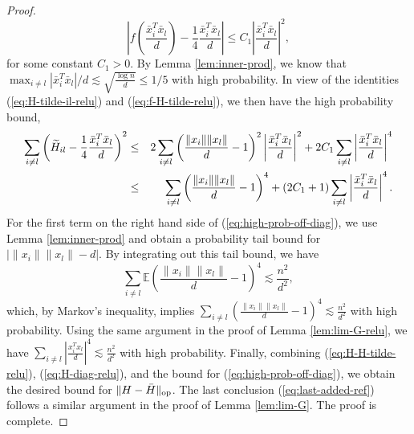 \begin{proof}
$$\left|f\left(\frac{\bar{x}_i^T\bar{x}_l}{d}\right)-\frac{1}{4}\frac{\bar{x}_i^T\bar{x}_l}{d}\right|\leq C_1\left|\frac{\bar{x}_i^T\bar{x}_l}{d}\right|^2,$$
for some constant $C_1>0$. By Lemma \ref{lem:inner-prod}, we know that $\max_{i\neq l}|\bar{x}_i^T\bar{x}_l|/d\lesssim \sqrt{\frac{\log n}{d}}\leq 1/5$ with high probability. In view of the identities (\ref{eq:H-tilde-il-relu}) and (\ref{eq:f-H-tilde-relu}), we then have the high probability bound,
\begin{eqnarray}
\nonumber \sum_{i\neq l}\left(\wt{H}_{il}-\frac{1}{4}\frac{\bar{x}_i^T\bar{x}_l}{d}\right)^2 &\leq& 2\sum_{i\neq l}\left(\frac{\|x_i\|\|x_l\|}{d}-1\right)^2\left|\frac{\bar{x}_i^T\bar{x}_l}{d}\right|^2  + 2C_1\sum_{i\neq l}\left|\frac{\bar{x}_i^T\bar{x}_l}{d}\right|^4 \\
 \label{eq:high-prob-off-diag} &\leq& \sum_{i\neq l}\left(\frac{\|x_i\|\|x_l\|}{d}-1\right)^4 + (2C_1+1)\sum_{i\neq l}\left|\frac{\bar{x}_i^T\bar{x}_l}{d}\right|^4.
\end{eqnarray}
For the first term on the right hand side of (\ref{eq:high-prob-off-diag}), we use Lemma \ref{lem:inner-prod} and obtain a probability tail bound for $|\|x_i\|\|x_l\|-d|$. By integrating out this tail bound, we have
$$\sum_{i\neq l}\mathbb{E}\left(\frac{\|x_i\|\|x_l\|}{d}-1\right)^4\lesssim \frac{n^2}{d^2},$$
which, by Markov's inequality, implies $\sum_{i\neq l}\left(\frac{\|x_i\|\|x_l\|}{d}-1\right)^4\lesssim \frac{n^2}{d^2}$ with high probability.
Using the same argument in the proof of Lemma \ref{lem:lim-G-relu}, we have $\sum_{i\neq l}\left|\frac{x_i^Tx_l}{d}\right|^4\lesssim \frac{n^2}{d^2}$ with high probability.
Finally, combining (\ref{eq:H-H-tilde-relu}), (\ref{eq:H-diag-relu}), and the bound for (\ref{eq:high-prob-off-diag}), we obtain the desired bound for $\|H-\bar{H}\|_{\rm op}$.
The last conclusion (\ref{eq:last-added-ref}) follows a similar argument in the proof of Lemma \ref{lem:lim-G}. The proof is complete.
\end{proof}






